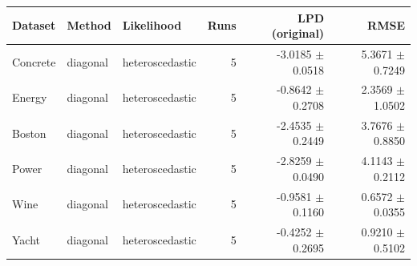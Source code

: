 \begin{tabular}{lllrrr}
\toprule
Dataset & Method & Likelihood & Runs & LPD (original) & RMSE \\
\midrule
Concrete & diagonal & heteroscedastic & 5 & -3.0185 $\pm$ 0.0518 & 5.3671 $\pm$ 0.7249 \\
Energy & diagonal & heteroscedastic & 5 & -0.8642 $\pm$ 0.2708 & 2.3569 $\pm$ 1.0502 \\
Boston & diagonal & heteroscedastic & 5 & -2.4535 $\pm$ 0.2449 & 3.7676 $\pm$ 0.8850 \\
Power & diagonal & heteroscedastic & 5 & -2.8259 $\pm$ 0.0490 & 4.1143 $\pm$ 0.2112 \\
Wine & diagonal & heteroscedastic & 5 & -0.9581 $\pm$ 0.1160 & 0.6572 $\pm$ 0.0355 \\
Yacht & diagonal & heteroscedastic & 5 & -0.4252 $\pm$ 0.2695 & 0.9210 $\pm$ 0.5102 \\
\bottomrule
\end{tabular}
